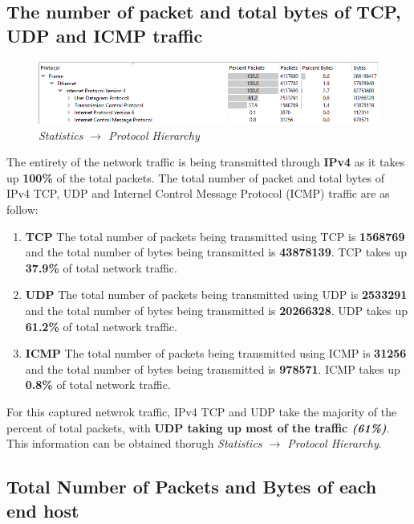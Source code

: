 \documentclass[a4paper,11pt]{article}
\begin{document}
\subsection{The number of packet and total bytes of TCP, UDP and ICMP traffic }
\begin{figure}[h!]
	\includegraphics[width = 16cm]{Traffic}
	\caption{\textit{Statistics $\rightarrow$ Protocol Hierarchy}}
\end{figure}
The entirety of the network traffic is being transmitted through \textbf{IPv4} as it takes up \textbf{100\%} of the total packets.
The total number of packet and total bytes of IPv4 TCP, UDP and Internel Control Message Protocol (ICMP) traffic are as follow:
\begin{enumerate}
	\item \textbf{TCP}
	\newline
	The total number of packets being transmitted using TCP is \textbf{1568769} and  the total number of bytes being transmitted is \textbf{43878139}.
	TCP takes up \textbf{37.9\%} of total network traffic.
	\item \textbf{UDP}
	\newline
	The total number of packets being transmitted using UDP is \textbf{2533291} and  the total number of bytes being transmitted is \textbf{20266328}. 	
	UDP takes up \textbf{61.2\%} of total network traffic.
	\item \textbf{ICMP}
	\newline
	The total number of packets being transmitted using ICMP is \textbf{31256} and  the total number of bytes being transmitted is \textbf{978571}. 	
	ICMP takes up \textbf{0.8\%} of total network traffic.
\end{enumerate}
For this captured netwrok traffic, IPv4 TCP and UDP take the majority of the percent of total packets, with \textbf{UDP taking up most of the traffic \textit{(61\%)}}.
This information can be obtained thorugh \textit{Statistics $\rightarrow$ Protocol Hierarchy}.



\subsection{Total Number of Packets and Bytes of each end host}
\end{document}

